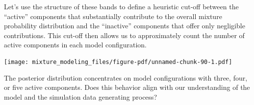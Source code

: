 \documentclass[
  letterpaper,
  DIV=11,
  numbers=noendperiod]{scrartcl}
\newenvironment{Shaded}{\begin{snugshade}}{\end{snugshade}}
\newcommand{\AttributeTok}[1]{\textcolor[rgb]{0.40,0.45,0.13}{#1}}
\newcommand{\ControlFlowTok}[1]{\textcolor[rgb]{0.00,0.23,0.31}{#1}}
\newcommand{\DecValTok}[1]{\textcolor[rgb]{0.68,0.00,0.00}{#1}}
\newcommand{\FloatTok}[1]{\textcolor[rgb]{0.68,0.00,0.00}{#1}}
\newcommand{\FunctionTok}[1]{\textcolor[rgb]{0.28,0.35,0.67}{#1}}
\newcommand{\NormalTok}[1]{\textcolor[rgb]{0.00,0.23,0.31}{#1}}
\newcommand{\OtherTok}[1]{\textcolor[rgb]{0.00,0.23,0.31}{#1}}
\newcommand{\SpecialCharTok}[1]{\textcolor[rgb]{0.37,0.37,0.37}{#1}}
\newcommand{\StringTok}[1]{\textcolor[rgb]{0.13,0.47,0.30}{#1}}
\begin{document}
Let's use the structure of these bands to define a heuristic cut-off
between the ``active'' components that substantially contribute to the
overall mixture probability distribution and the ``inactive'' components
that offer only negligible contributions. This cut-off then allows us to
approximately count the number of active components in each model
configuration.

\begin{Shaded}
\end{Shaded}

\texttt{[image: mixture\_modeling\_files/figure-pdf/unnamed-chunk-90-1.pdf]}

The posterior distribution concentrates on model configurations with
three, four, or five active components. Does this behavior align with
our understanding of the model and the simulation data generating
process?
\end{document}
